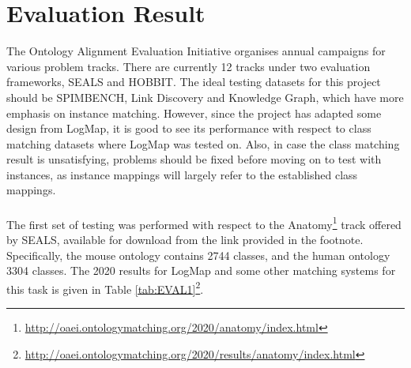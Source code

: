 \section{Evaluation Result}

The Ontology Alignment Evaluation Initiative organises annual campaigns for various problem tracks. There are currently 12 tracks under two evaluation frameworks, SEALS and HOBBIT. The ideal testing datasets for this project should be SPIMBENCH, Link Discovery and Knowledge Graph, which have more emphasis on instance matching. However, since the project has adapted some design from LogMap, it is good to see its performance with respect to class matching datasets where LogMap was tested on. Also, in case the class matching result is unsatisfying, problems should be fixed before moving on to test with instances, as instance mappings will largely refer to the established class mappings.
\\\\
The first set of testing was performed with respect to the Anatomy\footnote{\url{http://oaei.ontologymatching.org/2020/anatomy/index.html}} track offered by SEALS, available for download from the link provided in the footnote. Specifically, the mouse ontology contains 2744 classes, and the human ontology 3304 classes. The 2020 results for LogMap and some other matching systems for this task is given in Table \ref{tab:EVAL1}\footnote{\url{http://oaei.ontologymatching.org/2020/results/anatomy/index.html}}.


